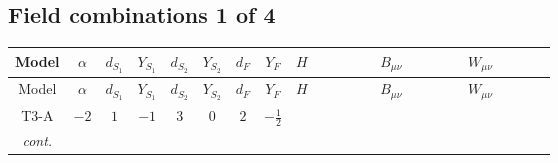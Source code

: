 \documentclass[8pt]{article}
\begin{document}
\begin{landscape}
\subsection*{Field combinations 1 of 4}
\begin{longtable}{@{}cccccccc >{\raggedright\arraybackslash}p{0.21\linewidth} >{\raggedright\arraybackslash}p{0.21\linewidth} >{\raggedright\arraybackslash}p{0.21\linewidth}@{}}
\toprule
Model & $\alpha$ & $d_{S_1}$ & $Y_{S_1}$ & $d_{S_2}$ & $Y_{S_2}$ & $d_F$ & $Y_F$ & $H$ & $B_{\mu\nu}$ & $W_{\mu\nu}$ \\
\midrule
\endfirsthead
\toprule
Model & $\alpha$ & $d_{S_1}$ & $Y_{S_1}$ & $d_{S_2}$ & $Y_{S_2}$ & $d_F$ & $Y_F$ & $H$ & $B_{\mu\nu}$ & $W_{\mu\nu}$ \\
\midrule
\endhead
T3-A & $-2$ & $1$ & $-1$ & $3$ & $0$ & $2$ & $-\frac{1}{2}$ & \scriptsize\adjustbox{max width=\linewidth}{$\begin{gathered} +\text{CH21} H_{a_1} H_{a_1}{}^{\dagger } \\ -H_{a_1} \mu ^2 H_{a_1}{}^{\dagger } \\ +\frac{2 \hbar  \overline{\lambda_5} H_{a_1} H_{a_2} \lambda_5 H_{a_1}{}^{\dagger } H_{a_2}{}^{\dagger }}{\sqrt{3} \epsilon }\end{gathered}$} & \scriptsize\adjustbox{max width=\linewidth}{$\begin{gathered} -\frac{7 \hbar  B_{\mu _1\mu _2}^2}{12 \epsilon } \\ -\frac{1}{12} \hbar  \log \left(\frac{\bar{\mu}^{2}}{m_1^2}\right) B_{\mu _1\mu _2}^2\end{gathered}$} & \scriptsize\adjustbox{max width=\linewidth}{$\begin{gathered} -\frac{2 \hbar  \left(W_{\mu _1\mu _2}^{A_1}\right){}^2}{3 \epsilon } \\ -\frac{1}{6} \hbar  \log \left(\frac{\bar{\mu}^{2}}{m_2^2}\right) \left(W_{\mu _1\mu _2}^{A_1}\right){}^2\end{gathered}$} \\
\textit{cont.} &  &  &  &  &  &  &  & \scriptsize\adjustbox{max width=\linewidth}{$\begin{gathered} +\frac{2 \hbar  \overline{\lambda_5} H_{a_1} H_{a_2} m_1^2 \lambda_5 H_{a_1}{}^{\dagger } H_{a_2}{}^{\dagger }}{\sqrt{3} \left(m_1^2-m_2^2\right)} \\ +\frac{2 \hbar  \log \left(\frac{\bar{\mu}^{2}}{m_1^2}\right) \overline{\lambda_5} H_{a_1} H_{a_2} m_1^2 \lambda_5 H_{a_1}{}^{\dagger } H_{a_2}{}^{\dagger }}{\sqrt{3} \left(m_1^2-m_2^2\right)} \\ -\frac{2 \hbar  \overline{\lambda_5} H_{a_1} H_{a_2} m_2^2 \lambda_5 H_{a_1}{}^{\dagger } H_{a_2}{}^{\dagger }}{\sqrt{3} \left(m_1^2-m_2^2\right)}\end{gathered}$} &  &  \\

\end{longtable}
\end{landscape}
\end{document}
